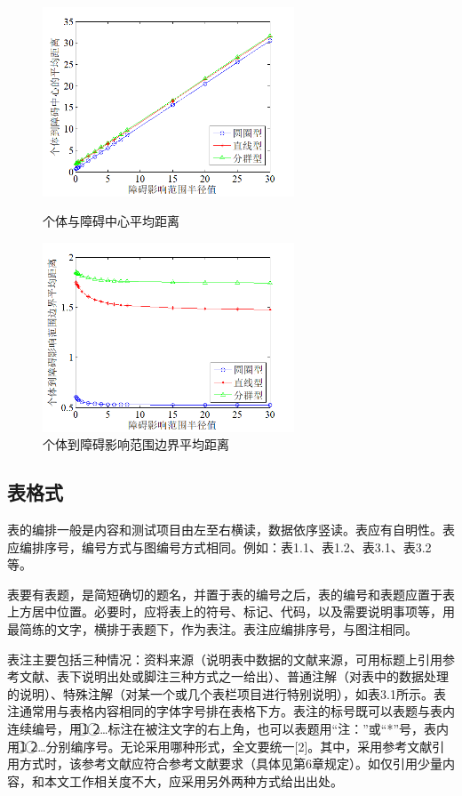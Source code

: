 \begin{figure}[htbp] 
	\begin{minipage}[t]{0.5\linewidth} 
		\centering 
		\includegraphics[width=7.5cm]{images/chapters/3.4} 
		\caption{个体与障碍中心平均距离} 
		\label{fig:3.4} 
	\end{minipage}%
	\begin{minipage}[t]{0.5\linewidth} 
		\centering 
		\includegraphics[width=7.5cm]{images/chapters/3.5} 
		\caption{个体到障碍影响范围边界平均距离} 
		\label{fig:3.5} 
	\end{minipage} 
\end{figure}


\subsection{表格式}
表的编排一般是内容和测试项目由左至右横读，数据依序竖读。表应有自明性。表应编排序号，编号方式与图编号方式相同。例如：表1.1、表1.2、表3.1、表3.2等。

表要有表题，是简短确切的题名，并置于表的编号之后，表的编号和表题应置于表上方居中位置。必要时，应将表上的符号、标记、代码，以及需要说明事项等，用最简练的文字，横排于表题下，作为表注。表注应编排序号，与图注相同。

表注主要包括三种情况：资料来源（说明表中数据的文献来源，可用标题上引用参考文献、表下说明出处或脚注三种方式之一给出）、普通注解（对表中的数据处理的说明）、特殊注解（对某一个或几个表栏项目进行特别说明），如表3.1所示。表注通常用与表格内容相同的字体字号排在表格下方。表注的标号既可以表题与表内连续编号，用\textcircled{1} \textcircled{2}…标注在被注文字的右上角，也可以表题用“注：”或“*”号，表内用\textcircled{1} \textcircled{2}…分别编序号。无论采用哪种形式，全文要统一[2]。其中，采用参考文献引用方式时，该参考文献应符合参考文献要求（具体见第6章规定）。如仅引用少量内容，和本文工作相关度不大，应采用另外两种方式给出出处。

